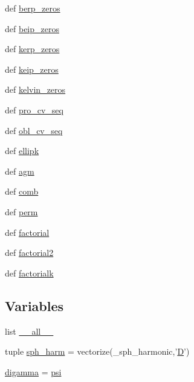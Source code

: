 \begin{DoxyCompactItemize}
\item 
def \hyperlink{namespacescipy_1_1special_1_1basic_aa4293979107c90fcda6e708a6e7514bd}{berp\+\_\+zeros}
\item 
def \hyperlink{namespacescipy_1_1special_1_1basic_ac95d62f6c499d49ba6e844109d7f0748}{beip\+\_\+zeros}
\item 
def \hyperlink{namespacescipy_1_1special_1_1basic_a07020c355ff483eb897e41f9807adbbd}{kerp\+\_\+zeros}
\item 
def \hyperlink{namespacescipy_1_1special_1_1basic_a9bd2cb4916b90a108f476c5f4fce77bc}{keip\+\_\+zeros}
\item 
def \hyperlink{namespacescipy_1_1special_1_1basic_ae16e7965832173556301f05460a8bf68}{kelvin\+\_\+zeros}
\item 
def \hyperlink{namespacescipy_1_1special_1_1basic_acbe80912bff24b12d28a54d3d0407fa9}{pro\+\_\+cv\+\_\+seq}
\item 
def \hyperlink{namespacescipy_1_1special_1_1basic_a2872a74b278bf0d1c8380bcc5b229770}{obl\+\_\+cv\+\_\+seq}
\item 
def \hyperlink{namespacescipy_1_1special_1_1basic_a6300b203ab8dcb424768f9432bf1fc49}{ellipk}
\item 
def \hyperlink{namespacescipy_1_1special_1_1basic_a7adbb3aefb7a80b7687bf65b1e2c8a4e}{agm}
\item 
def \hyperlink{namespacescipy_1_1special_1_1basic_ab50515709c9c1aa645c02d8d201d0496}{comb}
\item 
def \hyperlink{namespacescipy_1_1special_1_1basic_ac28c7b5de16e9ebe51eff1f565c0faa6}{perm}
\item 
def \hyperlink{namespacescipy_1_1special_1_1basic_a3c29009801e64aad15056a1852dded84}{factorial}
\item 
def \hyperlink{namespacescipy_1_1special_1_1basic_ac61e7b7e0ea8346f1b2d80dcd3058384}{factorial2}
\item 
def \hyperlink{namespacescipy_1_1special_1_1basic_a693e2b012fad329ad2afa5b408f9ded9}{factorialk}
\end{DoxyCompactItemize}
\subsection*{Variables}
\begin{DoxyCompactItemize}
\item 
list \hyperlink{namespacescipy_1_1special_1_1basic_a48172f8d753d274415af5625e7a69f5d}{\+\_\+\+\_\+all\+\_\+\+\_\+}
\item 
tuple \hyperlink{namespacescipy_1_1special_1_1basic_a0d632757ff151223a8f17c95085b1b6c}{sph\+\_\+harm} = vectorize(\+\_\+sph\+\_\+harmonic,'\hyperlink{odrpack_8h_a7dae6ea403d00f3687f24a874e67d139}{D}')
\item 
\hyperlink{namespacescipy_1_1special_1_1basic_ab4529d1e1d519275dda5023781fb58d8}{digamma} = \hyperlink{cephes_8h_a3e817b9d60b92a003ca2d1cd5d367efd}{psi}
\end{DoxyCompactItemize}


